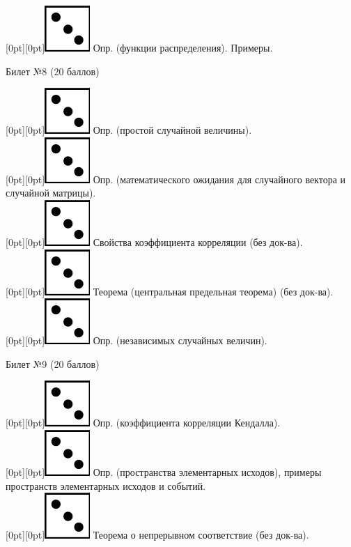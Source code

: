 \documentclass[10pt]{article}
\begin{document}
\raisebox{-1pt}[0pt][0pt]{\includegraphics[width=0.02\linewidth]{3.png}} Опр. (функции распределения). Примеры. \\
\begin{center} {\Large Билет №8 (20 баллов)} \end{center}
\raisebox{-1pt}[0pt][0pt]{\includegraphics[width=0.02\linewidth]{3.png}} Опр. (простой случайной величины). \\
\raisebox{-1pt}[0pt][0pt]{\includegraphics[width=0.02\linewidth]{3.png}} Опр. (математического ожидания для случайного вектора и случайной матрицы). \\
\raisebox{-1pt}[0pt][0pt]{\includegraphics[width=0.02\linewidth]{3.png}} Свойства коэффициента корреляции (без док-ва). \\
\raisebox{-1pt}[0pt][0pt]{\includegraphics[width=0.02\linewidth]{3.png}} Теорема (центральная предельная теорема) (без док-ва). \\
\raisebox{-1pt}[0pt][0pt]{\includegraphics[width=0.02\linewidth]{3.png}} Опр. (независимых случайных величин). \\
\begin{center} {\Large Билет №9 (20 баллов)} \end{center}
\raisebox{-1pt}[0pt][0pt]{\includegraphics[width=0.02\linewidth]{3.png}} Опр. (коэффициента корреляции Кендалла). \\
\raisebox{-1pt}[0pt][0pt]{\includegraphics[width=0.02\linewidth]{3.png}} Опр. (пространства элементарных исходов), примеры пространств элементарных исходов и событий. \\
\raisebox{-1pt}[0pt][0pt]{\includegraphics[width=0.02\linewidth]{3.png}} Теорема о непрерывном соответствие (без док-ва). \\
\end{document}
